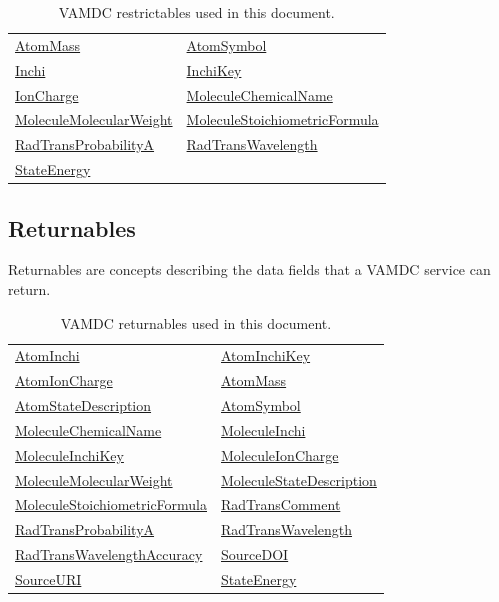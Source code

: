 \documentclass[11pt,a4paper]{ivoa}
\def\vamdcretlink#1{\href{https://dictionary.vamdc.eu/returnables/\##1}{#1}}
\def\vamdcreslink#1{\href{https://dictionary.vamdc.eu/restrictables/\##1}{#1}}
\begin{document}
\begin{table}[H]
\centering
\begin{tabular}{ll}
\hline
\vamdcreslink{AtomMass} & \vamdcreslink{AtomSymbol} \\
\vamdcreslink{Inchi} & \vamdcreslink{InchiKey} \\
\vamdcreslink{IonCharge} & \vamdcreslink{MoleculeChemicalName} \\
\vamdcreslink{MoleculeMolecularWeight} & \vamdcreslink{MoleculeStoichiometricFormula} \\
\vamdcreslink{RadTransProbabilityA} & \vamdcreslink{RadTransWavelength} \\
\vamdcreslink{StateEnergy} & \\
\hline
\end{tabular}
\caption{VAMDC restrictables used in this document.}
\label{tab:vamdc-restrictables}
\end{table}

\subsection*{Returnables}

Returnables are concepts describing the data fields that a VAMDC service can return.

\begin{table}[H]
\centering
\begin{tabular}{ll}
\hline
\vamdcretlink{AtomInchi} & \vamdcretlink{AtomInchiKey} \\
\vamdcretlink{AtomIonCharge} & \vamdcretlink{AtomMass} \\
\vamdcretlink{AtomStateDescription} & \vamdcretlink{AtomSymbol} \\
\vamdcretlink{MoleculeChemicalName} & \vamdcretlink{MoleculeInchi} \\
\vamdcretlink{MoleculeInchiKey} & \vamdcretlink{MoleculeIonCharge} \\
\vamdcretlink{MoleculeMolecularWeight} & \vamdcretlink{MoleculeStateDescription} \\
\vamdcretlink{MoleculeStoichiometricFormula} & \vamdcretlink{RadTransComment} \\
\vamdcretlink{RadTransProbabilityA} & \vamdcretlink{RadTransWavelength} \\
\vamdcretlink{RadTransWavelengthAccuracy} & \vamdcretlink{SourceDOI} \\
\vamdcretlink{SourceURI} & \vamdcretlink{StateEnergy} \\
\hline
\end{tabular}
\caption{VAMDC returnables used in this document.}
\label{tab:vamdc-returnables}
\end{table}
\end{document}
